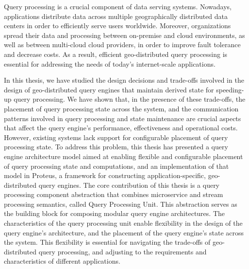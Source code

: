 Query processing is a crucial component of data serving systems.
Nowadays, applications distribute data across multiple geographically distributed data centers in order to
efficiently serve users worldwide.
Moreover, organizations spread their data and processing between on-premise and cloud environments,
as well as between multi-cloud cloud providers, in order to improve fault tolerance and decrease costs.
As a result, efficient geo-distributed query processing is essential for addressing the needs of today's internet-scale
applications.

In this thesis, we have studied the design decisions and trade-offs involved in the design of geo-distributed query engines
that maintain derived state for speeding-up query processing.
We have shown that, in the presence of these trade-offs, the placement of query processing state across the system,
and the communication patterns involved in query processing and state maintenance are crucial aspects that affect
the query engine's performance, effectiveness and operational costs.
However, existing systems lack support for configurable placement of query processing state.
To address this problem, this thesis has presented a query engine architecture model aimed at enabling flexible and
configurable placement of query processing state and computations,
and an implementation of that model in Proteus, a framework for constructing application-specific, geo-distributed
query engines.
The core contribution of this thesis is a query processing component abstraction that combines microservice and
stream processing semantics, called Query Processing Unit.
This abstraction serves as the building block for composing modular query engine architectures.
The characteristics of the query processing unit enable flexibility in the design of the query engine's architecture,
and the placement of the query engine's state across the system.
This flexibility is essential for navigating the trade-offs of geo-distributed query processing,
and adjusting to the requirements and characteristics of different applications.